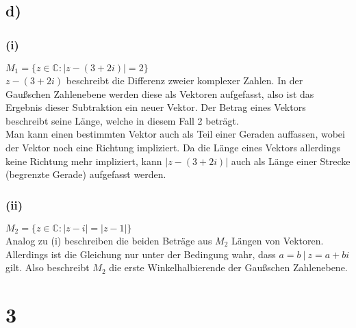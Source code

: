 \documentclass[a4paper]{scrartcl}
\begin{document}
\subsection{d)}
\subsubsection{(i)}
\(M_1=\Big\{z\in\mathbb{C}:|z-(3+2i)|=2 \Big\}\) \\
\(z-(3+2i)\) beschreibt die Differenz zweier komplexer Zahlen. In der Gaußschen Zahlenebene werden diese als Vektoren aufgefasst, also ist das Ergebnis dieser Subtraktion ein neuer Vektor.
Der Betrag eines Vektors beschreibt seine Länge, welche in diesem Fall 2 beträgt. \\
Man kann einen bestimmten Vektor auch als Teil einer Geraden auffassen, wobei der Vektor noch eine Richtung impliziert. Da die Länge eines Vektors allerdings keine Richtung mehr impliziert, kann \(|z-(3+2i)|\) auch als Länge einer Strecke (begrenzte Gerade) aufgefasst werden.
\subsubsection{(ii)}
\(M_2=\Big\{z\in\mathbb{C}:|z-i|=|z-1| \Big\}\) \\
Analog zu (i) beschreiben die beiden Beträge aus \(M_2\) Längen von Vektoren. Allerdings ist die Gleichung nur unter der Bedingung wahr, dass \(a=b\ |\ z=a+bi\) gilt.
Also beschreibt \(M_2\) die erste Winkelhalbierende der Gaußschen Zahlenebene. \\

\section{3}
\end{document}
